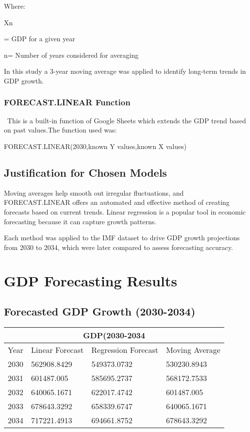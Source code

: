 \documentclass{article}
\begin{document}
\large{Where:

X\tiny{n}\large{= GDP for a given year

n= Number of years considered for averaging}


In this study a 3-year moving average was applied to identify long-term trends in GDP growth.

\subsubsection{FORECAST.LINEAR Function}\
This is a built-in function of Google Sheets which extends the GDP trend based on past values.The function used was:


\Large{FORECAST.LINEAR(2030,known Y values,known X values)}

\large{
\subsection{Justification for Chosen Models}
Moving averages help smooth out irregular fluctuations, and FORECAST.LINEAR offers an automated and effective method of creating forecasts based on current trends. Linear regression is a popular tool in economic forecasting because it can capture growth patterns.

Each method was applied to the IMF dataset to drive GDP growth projections from 2030 to 2034, which were later compared to assess forecasting accuracy.}

\section{GDP Forecasting Results}
\subsection{Forecasted GDP Growth (2030-2034)}
\begin{tabular}{ |p{3cm}||p{3cm}|p{3cm}|p{3cm}|  }
 \hline
 \multicolumn{4}{|c|}{GDP(2030-2034} \\
 \hline
 Year& Linear Forecast &Regression Forecast&Moving Average\\
 \hline
 2030  & 562908.8429   &549373.0732&   530230.8943\\
 2031&   601487.005  & 585695.2737  &568172.7533\\
 2032 &640065.1671 & 622017.4742&  601487.005\\
 2033 &678643.3292 & 658339.6747&  640065.1671\\
 2034&   717221.4913  & 694661.8752&678643.3292\\
 \hline
\end{tabular}

}
\end{document}
